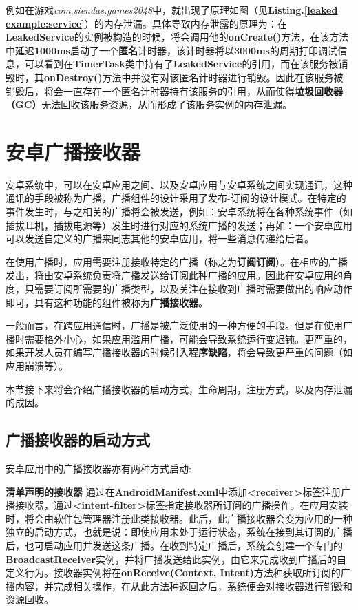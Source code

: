 例如在游戏\emph{com.siendas.games2048}中，就出现了原理如图（见\textbf{Listing.\textcolor{red}{\ref{leaked example:service}}}）的内存泄漏。具体导致内存泄露的原理为：在\textbf{LeakedService}的实例被构造的时候，将会调用他的\textbf{onCreate()}方法，在该方法中延迟\textbf{1000ms}启动了一个\textbf{匿名}计时器，该计时器将以\textbf{3000ms}的周期打印调试信息，可以看到在\textbf{TimerTask}类中持有了\textbf{LeakedService}的引用，而在该服务被销毁时，其\textbf{onDestroy()}方法中并没有对该匿名计时器进行销毁。因此在该服务被销毁后，将会一直存在一个匿名计时器持有该服务的引用，从而使得\textbf{垃圾回收器（GC）}无法回收该服务资源，从而形成了该服务实例的内存泄漏。

\section{安卓广播接收器}

安卓系统中，可以在安卓应用之间、以及安卓应用与安卓系统之间实现通讯，这种通讯的手段被称为广播\cite{androidbroadcastsguide}，广播组件的设计采用了发布-订阅的设计模式。在特定的事件发生时，与之相关的广播将会被发送，例如：安卓系统将在各种系统事件（如插拔耳机，插拔电源等）发生时进行对应的系统广播的发送；再如：一个安卓应用可以发送自定义的广播来同志其他的安卓应用，将一些消息传递给后者。

在使用广播时，应用需要注册接收特定的广播（称之为\textbf{订阅订阅}）。在相应的广播发出，将由安卓系统负责将广播发送给订阅此种广播的应用。因此在安卓应用的角度，只需要订阅所需要的广播类型，以及关注在接收到广播时需要做出的响应动作即可，具有这种功能的组件被称为\textbf{广播接收器}。
	
一般而言，在跨应用通信时，广播是被广泛使用的一种方便的手段。但是在使用广播时需要格外小心，如果应用滥用广播，可能会导致系统运行变迟钝。更严重的，如果开发人员在编写广播接收器的时候引入\textbf{程序缺陷}，将会导致更严重的问题（如应用崩溃等）。

本节接下来将会介绍广播接收器的启动方式，生命周期，注册方式，以及内存泄漏的成因。

\subsection{广播接收器的启动方式}
安卓应用中的广播接收器亦有两种方式启动\cite{broadcast}:

\textbf{清单声明的接收器 }\label{declaration:receiver in manifest} 通过在\textbf{AndroidManifest.xml}中添加\textbf{<receiver>}标签注册广播接收器，通过\textbf{<intent-filter>}标签指定接收器所订阅的广播操作。在应用安装时，将会由软件包管理器注册此类接收器。此后，此广播接收器会变为应用的一种独立的启动方式，也就是说：即使应用未处于运行状态，系统在接到其订阅的广播后，也可启动应用并发送这条广播。在收到特定广播后，系统会创建一个专门的\textbf{BroadcastReceiver}实例，并将广播发送给此实例，由它来完成收到广播后的自定义行为。接收器实例将在\textbf{onReceive(Context, Intent)}方法种获取所订阅的广播内容，并完成相关操作，在从此方法种返回之后，系统便会对接收器进行销毁和资源回收。

